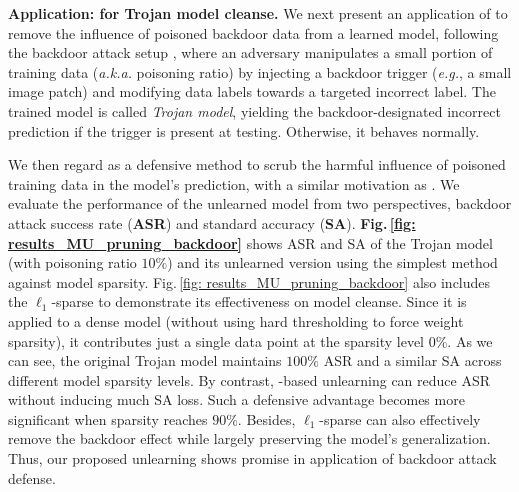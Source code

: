 {%



\noindent \textbf{Application: {\MU} for Trojan model cleanse.}
We next present an application of {\MU} to remove the influence of poisoned backdoor data from a learned model,  following the backdoor attack setup   \cite{gu2017badnets}, where an adversary 
manipulates a small portion of training data (\textit{a.k.a.}   poisoning ratio) by 
injecting a backdoor trigger (\textit{e.g.}, a small image patch) and modifying data labels towards a targeted incorrect label.  
The trained model is called \textit{Trojan model}, yielding the backdoor-designated incorrect prediction if the trigger is present at testing. Otherwise, it behaves normally. 


We then regard {\MU} as a defensive method to scrub the harmful influence of  poisoned training data in  the model's prediction, with a similar motivation as \citet{liu2022backdoor}.
We evaluate the performance of the unlearned model from two perspectives, backdoor attack success rate (\textbf{ASR}) and standard accuracy (\textbf{SA}). 
\textbf{Fig.\,\ref{fig: results_MU_pruning_backdoor}} shows   ASR and {SA} of the   Trojan model (with poisoning ratio $10\%$)  and its unlearned version using the simplest {\FT} method against model sparsity. {Fig.\,\ref{fig: results_MU_pruning_backdoor} also includes the $\ell_1$-sparse {\MU} to demonstrate its effectiveness on  model cleanse. Since it is applied to a dense model (without using hard thresholding to force weight sparsity), it contributes just a single data point at the sparsity level 0\%.}
As we can see, the  original Trojan model maintains $100\%$ ASR and a similar SA across different model sparsity levels. By contrast, {\FT}-based unlearning can  reduce ASR without inducing much {SA} loss. Such a defensive advantage becomes more significant when sparsity reaches $90\%$. {Besides, $\ell_1$-sparse {\MU} can also effectively remove the backdoor effect while largely preserving the model’s generalization.} 
Thus, our proposed unlearning shows promise in  application of backdoor attack defense.

}
